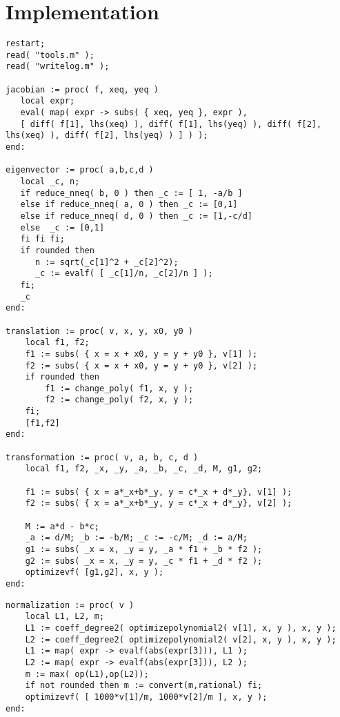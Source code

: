 \documentclass[a4paper,10pt]{article}
\begin{document}
\section{Implementation}

\begin{lstlisting}[name=type]
restart;
read( "tools.m" );
read( "writelog.m" );

jacobian := proc( f, xeq, yeq )
   local expr;
   eval( map( expr -> subs( { xeq, yeq }, expr ),
   [ diff( f[1], lhs(xeq) ), diff( f[1], lhs(yeq) ), diff( f[2], lhs(xeq) ), diff( f[2], lhs(yeq) ) ] ) );
end:

eigenvector := proc( a,b,c,d )
   local _c, n;
   if reduce_nneq( b, 0 ) then _c := [ 1, -a/b ]
   else if reduce_nneq( a, 0 ) then _c := [0,1]
   else if reduce_nneq( d, 0 ) then _c := [1,-c/d]
   else  _c := [0,1]
   fi fi fi;
   if rounded then
      n := sqrt(_c[1]^2 + _c[2]^2);
      _c := evalf( [ _c[1]/n, _c[2]/n ] );
   fi;
   _c
end:

translation := proc( v, x, y, x0, y0 )
    local f1, f2;
    f1 := subs( { x = x + x0, y = y + y0 }, v[1] );
    f2 := subs( { x = x + x0, y = y + y0 }, v[2] );
    if rounded then
        f1 := change_poly( f1, x, y );
        f2 := change_poly( f2, x, y );
    fi;
    [f1,f2]
end:

transformation := proc( v, a, b, c, d )
    local f1, f2, _x, _y, _a, _b, _c, _d, M, g1, g2;

    f1 := subs( { x = a*_x+b*_y, y = c*_x + d*_y}, v[1] );
    f2 := subs( { x = a*_x+b*_y, y = c*_x + d*_y}, v[2] );

    M := a*d - b*c;
    _a := d/M; _b := -b/M; _c := -c/M; _d := a/M;
    g1 := subs( _x = x, _y = y, _a * f1 + _b * f2 );
    g2 := subs( _x = x, _y = y, _c * f1 + _d * f2 );
    optimizevf( [g1,g2], x, y );
end:
\end{lstlisting}

\begin{lstlisting}[name=type]
normalization := proc( v )
    local L1, L2, m;
    L1 := coeff_degree2( optimizepolynomial2( v[1], x, y ), x, y );
    L2 := coeff_degree2( optimizepolynomial2( v[2], x, y ), x, y );
    L1 := map( expr -> evalf(abs(expr[3])), L1 );
    L2 := map( expr -> evalf(abs(expr[3])), L2 );
    m := max( op(L1),op(L2));
    if not rounded then m := convert(m,rational) fi;
    optimizevf( [ 1000*v[1]/m, 1000*v[2]/m ], x, y );
end:
\end{lstlisting}
\end{document}
